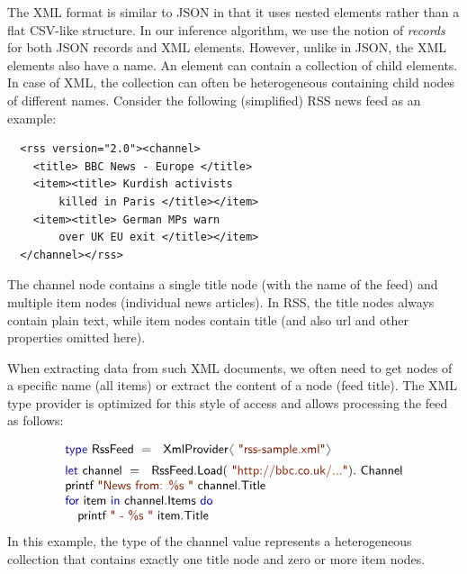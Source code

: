 \documentclass[preprint]{sigplanconf}
\newcommand{\langl}{\begin{picture}(4.5,7)
\put(1.1,2.5){\rotatebox{60}{\line(1,0){5.5}}}
\put(1.1,2.5){\rotatebox{300}{\line(1,0){5.5}}}
\end{picture}}
\newcommand{\rangl}{\begin{picture}(4.5,7)
\put(.9,2.5){\rotatebox{120}{\line(1,0){5.5}}}
\put(.9,2.5){\rotatebox{240}{\line(1,0){5.5}}}
\end{picture}}
\newcommand{\kvd}[1]{\textnormal{\textcolor{kvdclr}{\sffamily #1}}}
\newcommand{\str}[1]{\textnormal{\textcolor{strclr}{\sffamily "#1"}}}
\newcommand{\ident}[1]{\textnormal{\sffamily #1}}
\begin{document}
The XML format is similar to JSON in that it uses nested elements rather than a flat CSV-like 
structure. In our inference algorithm, we use the notion of \emph{records} for both JSON records 
and XML elements. However, unlike in JSON, the XML elements also have a name. An element can 
contain a collection of child elements. In case of XML, the collection can often be heterogeneous 
containing child nodes of different names. Consider the following (simplified) RSS news feed as an example:
%
{\small{
\begin{verbatim}
  <rss version="2.0"><channel>
    <title> BBC News - Europe </title>
    <item><title> Kurdish activists 
        killed in Paris </title></item>
    <item><title> German MPs warn 
        over UK EU exit </title></item>
  </channel></rss>
\end{verbatim}
}}
%
\noindent
The \ident{channel} node contains a single \ident{title} node (with the name of the feed) and multiple 
\ident{item} nodes (individual news articles). In RSS, the \ident{title} nodes always contain plain text,
while \ident{item} nodes contain \ident{title} (and also \ident{url} and other properties omitted here).

When extracting data from such XML documents, we often need to get nodes of a specific name (all
items) or extract the content of a node (feed title). The XML type provider is optimized for 
this style of access and allows processing the feed as follows:

\noindent
\begin{equation*}
\begin{array}{l}
 \kvd{type}~\ident{RssFeed}~=~\ident{XmlProvider}\langl\str{rss-sample.xml}\rangl\hspace{1em} \\[0.5em]
 \kvd{let}~\ident{channel}~=~\ident{RssFeed.Load}(\str{http://bbc.co.uk/...}).\ident{Channel}\\
 \ident{printf}~\str{News from: \%s }~\ident{channel.Title}\\
 \kvd{for}~\ident{item}~\kvd{in}~\ident{channel.Items}~\kvd{do}\\
 \quad\ident{printf}~\str{ - \%s }~\ident{item.Title}\\
\end{array}
\end{equation*}
%
In this example, the type of the \ident{channel} value represents a heterogeneous collection
that contains exactly one \ident{title} node and zero or more \ident{item} nodes.
\end{document}
